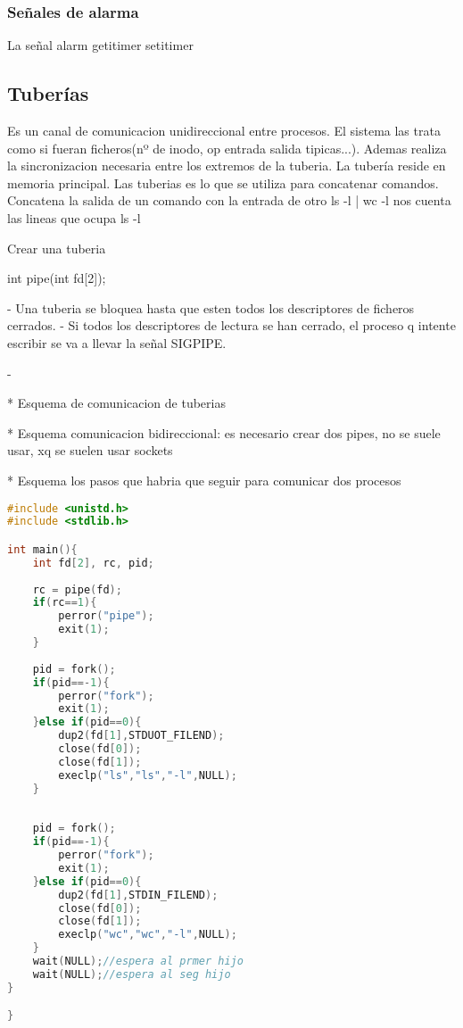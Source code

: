 \subsubsection{Señales de alarma}
La señal alarm
getitimer
setitimer
\subsection{Tuberías}
Es un canal de comunicacion unidireccional entre procesos. El sistema las trata como si fueran ficheros(nº de inodo, op entrada salida tipicas...). Ademas realiza la sincronizacion necesaria entre los extremos de la tuberia. La tubería reside en memoria principal. Las tuberias es lo que se utiliza para concatenar comandos. Concatena la salida de un comando con la entrada de otro
ls -l | wc -l nos cuenta las lineas que ocupa ls -l

Crear una tuberia

int pipe(int fd[2]);

- Una tuberia se bloquea hasta que esten todos los descriptores de ficheros cerrados.
- Si todos los descriptores de lectura se han cerrado, el proceso q intente escribir se va a llevar la señal SIGPIPE.

- 

* Esquema de comunicacion de tuberias

* Esquema comunicacion bidireccional: es necesario crear dos pipes, no se suele usar, xq se suelen usar sockets

* Esquema los pasos que habria que seguir para comunicar dos procesos

\begin{lstlisting}[language=C++]
#include <unistd.h>
#include <stdlib.h>

int main(){
    int fd[2], rc, pid;
    
    rc = pipe(fd);
    if(rc==1){
        perror("pipe");
        exit(1);
    }
    
    pid = fork();
    if(pid==-1){
        perror("fork");
        exit(1);
    }else if(pid==0){
        dup2(fd[1],STDUOT_FILEND);
        close(fd[0]);
        close(fd[1]);
        execlp("ls","ls","-l",NULL);
    }
    
    
    pid = fork();
    if(pid==-1){
        perror("fork");
        exit(1);
    }else if(pid==0){
        dup2(fd[1],STDIN_FILEND);
        close(fd[0]);
        close(fd[1]);
        execlp("wc","wc","-l",NULL);
    }
    wait(NULL);//espera al prmer hijo
    wait(NULL);//espera al seg hijo
}

}
\end{lstlisting}
